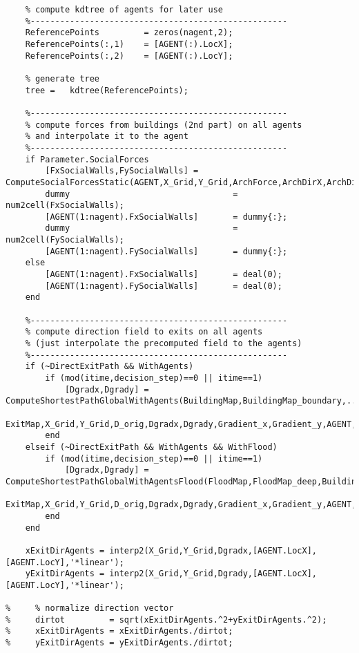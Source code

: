 \begin{lstlisting}[breaklines]
    %----------------------------------------------------
    % compute kdtree of agents for later use
    %----------------------------------------------------
    ReferencePoints         = zeros(nagent,2);
    ReferencePoints(:,1)    = [AGENT(:).LocX];
    ReferencePoints(:,2)    = [AGENT(:).LocY];

    % generate tree
    tree =   kdtree(ReferencePoints);

    %----------------------------------------------------
    % compute forces from buildings (2nd part) on all agents
    % and interpolate it to the agent
    %----------------------------------------------------
    if Parameter.SocialForces
        [FxSocialWalls,FySocialWalls] = ComputeSocialForcesStatic(AGENT,X_Grid,Y_Grid,ArchForce,ArchDirX,ArchDirY,Parameter);
        dummy                                 = num2cell(FxSocialWalls);
        [AGENT(1:nagent).FxSocialWalls]       = dummy{:};
        dummy                                 = num2cell(FySocialWalls);
        [AGENT(1:nagent).FySocialWalls]       = dummy{:};
    else
        [AGENT(1:nagent).FxSocialWalls]       = deal(0);
        [AGENT(1:nagent).FySocialWalls]       = deal(0);
    end

    %----------------------------------------------------
    % compute direction field to exits on all agents
    % (just interpolate the precomputed field to the agents)
    %----------------------------------------------------
    if (~DirectExitPath && WithAgents)
        if (mod(itime,decision_step)==0 || itime==1)
            [Dgradx,Dgrady] = ComputeShortestPathGlobalWithAgents(BuildingMap,BuildingMap_boundary,...
                ExitMap,X_Grid,Y_Grid,D_orig,Dgradx,Dgrady,Gradient_x,Gradient_y,AGENT,nagent,Parameter);
        end
    elseif (~DirectExitPath && WithAgents && WithFlood)
        if (mod(itime,decision_step)==0 || itime==1)
            [Dgradx,Dgrady] = ComputeShortestPathGlobalWithAgentsFlood(FloodMap,FloodMap_deep,BuildingMap,BuildingMap_boundary,...
                ExitMap,X_Grid,Y_Grid,D_orig,Dgradx,Dgrady,Gradient_x,Gradient_y,AGENT,nagent,Parameter);
        end
    end

    xExitDirAgents = interp2(X_Grid,Y_Grid,Dgradx,[AGENT.LocX],[AGENT.LocY],'*linear');
    yExitDirAgents = interp2(X_Grid,Y_Grid,Dgrady,[AGENT.LocX],[AGENT.LocY],'*linear');

%     % normalize direction vector
%     dirtot         = sqrt(xExitDirAgents.^2+yExitDirAgents.^2);
%     xExitDirAgents = xExitDirAgents./dirtot;
%     yExitDirAgents = yExitDirAgents./dirtot;


\end{lstlisting}

